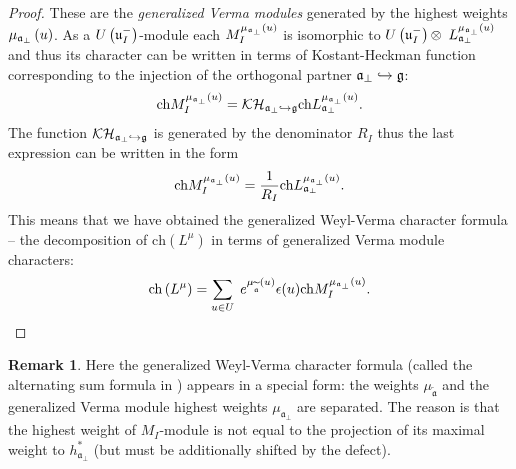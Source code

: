 \documentclass[12pt]{article}
\theoremstyle{definition}
\newtheorem{remark}{Remark}
\newcommand{\aft}{\widetilde{\mathfrak{a}}}
\newcommand{\afb}{\mathfrak{a}_{\bot}}
\begin{document}
\begin{proof}
These are the \textit{generalized Verma modules}  \cite{lepowsky1977generalization}
generated by the highest weights $\mu _{\frak{a}%
_{\perp }}\left( u\right) $. As a $U\left( \frak{u}_{I}^{-}\right) $-module
each $M_{I}^{\mu _{\frak{a}_{\perp }}\left( u\right) }$ is isomorphic to $%
U\left( \frak{u}_{I}^{-}\right) \otimes $ $L_{\frak{a}_{\perp }}^{\mu _{%
\frak{a}_{\perp }}\left( u\right) }$ and thus its character can be written
in terms of Kostant-Heckman function \cite{KostantHeckman1982} corresponding
to the injection of the orthogonal partner $\frak{a}_{\perp
}\hookrightarrow \frak{g}$:
\begin{equation*}
\mathrm{ch}M_{I}^{\mu _{\frak{a}_{\perp }}\left( u\right) }=\mathcal{KH}_{%
\frak{a}_{\perp }\hookrightarrow \frak{g}}\mathrm{ch}L_{\frak{a}_{\perp
}}^{\mu _{\frak{a}_{\perp }}\left( u\right) }.
\end{equation*}
The function $\mathcal{KH}_{\frak{a}_{\perp }\hookrightarrow \frak{%
g}}$ is generated by the denominator $R_{I}$ thus the last expression can be
written in the form
\begin{equation*}
\mathrm{ch}M_{I}^{\mu _{\frak{a}_{\perp }}\left( u\right) }=\frac{1}{R_{I}}%
\mathrm{ch}L_{\frak{a}_{\perp }}^{\mu _{\frak{a}_{\perp }}\left( u\right) }.
\end{equation*}
This means that we have obtained the generalized Weyl-Verma character formula
 -- the decomposition of $\mathrm{ch}\left(
L^{\mu }\right) $ in terms of generalized Verma module characters:
\begin{equation}
\mathrm{ch}\left( L^{\mu }\right) =\sum_{u\in U}\;e^{\mu _{\aft}\left(
u\right) }\epsilon (u)\mathrm{ch}M_{I}^{\mu _{\frak{a}_{\perp }}\left(
u\right) }.  \label{char in gen verma mod}
\end{equation}
\end{proof}

\begin{remark}
Here the generalized Weyl-Verma character formula (called the alternating sum
formula in \cite{humphreys2008representations}) appears in a special
form: the weights $\mu _{\aft}$ and the generalized Verma module highest weights
$\mu _{\afb}$ are separated. The reason is that the
highest weight of $M_{I}$-module is not equal to the projection of its maximal
weight to $h^*_{\afb}$ (but must be additionally shifted by the defect).
\end{remark}
\end{document}
